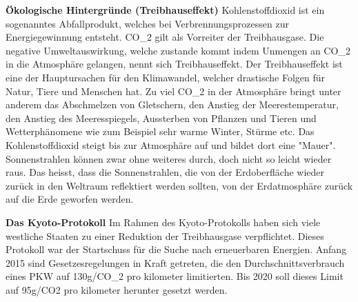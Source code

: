 \textbf{Ökologische Hintergründe (Treibhauseffekt)}
Kohlenstoffdioxid ist ein sogenanntes Abfallprodukt, welches bei Verbrennungsprozessen zur Energiegewinnung entsteht. 
CO_{2} gilt als Vorreiter der Treibhausgase.
Die negative Umweltauswirkung, welche zustande kommt indem Unmengen an CO_{2} in die Atmosphäre gelangen, 
nennt sich Treibhauseffekt. 
Der Treibhauseffekt ist eine der Hauptursachen für den Klimawandel, welcher drastische Folgen für Natur, Tiere und Menschen hat. 
Zu viel CO_{2} in der Atmosphäre bringt unter anderem das Abschmelzen von Gletschern, 
den Anstieg der Meerestemperatur, den Anstieg des Meeresspiegels, 
Aussterben von Pflanzen und Tieren und Wetterphänomene wie zum Beispiel sehr warme Winter, Stürme etc.
Das Kohlenstoffdioxid steigt bis zur Atmosphäre auf und bildet dort eine "Mauer".
Sonnenstrahlen können zwar ohne weiteres durch, doch nicht so leicht wieder raus. Das heisst, dass die Sonnenstrahlen,
die von der Erdoberfläche wieder zurück in den Weltraum reflektiert werden sollten, von der Erdatmosphäre zurück auf die Erde geworfen werden. 
 
\textbf{Das Kyoto-Protokoll}
Im Rahmen des Kyoto-Protokolls haben sich viele westliche Staaten zu einer Reduktion der Treibhausgase verpflichtet. 
Dieses Protokoll war der Startschuss für die Suche nach erneuerbaren Energien. 
Anfang 2015 sind Gesetzesregelungen in Kraft getreten, die den Durchschnittsverbrauch eines PKW auf 130g/CO_{2} pro kilometer limitierten. 
Bis 2020 soll dieses Limit auf 95g/CO2 pro kilometer herunter gesetzt werden.



\clearpage %